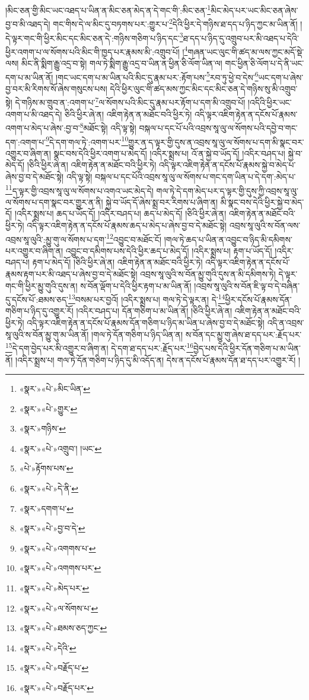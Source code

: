 །མིང་ཅན་གྱི་མིང་ཡང་འཐད་པ་ཡིན་ན་མིང་ཅན་མེད་ན་དེ་གང་གི་:མིང་ཅན་\footnote{«སྣར་»«པེ་»མིང་ཡིན་}མིང་མེད་པར་ཡང་མིང་ཅན་ཞེས་བྱ་བ་མི་འཐད་དེ། གང་གིས་དེ་ལ་མིང་དུ་བཏགས་པར་:གྱུར་པ་\footnote{«སྣར་»«པེ་»གྱུར་}དེའི་ཕྱིར་དེ་གཉིས་ཐ་དད་པ་ཉིད་ཀྱང་མ་ཡིན་ནོ། །དེ་ལྟར་གང་གི་ཕྱིར་མིང་དང་མིང་ཅན་དེ་:གཉིས་གཅིག་པ་ཉིད་དང་\footnote{«སྣར་»གཉིས་}ཐ་དད་པ་ཉིད་དུ་འགྲུབ་པར་མི་འཐད་པ་དེའི་ཕྱིར་འགག་པ་ལ་སོགས་པའི་མིང་གི་ཁྱད་པར་རྣམས་མི་:འགྲུབ་པོ། །\footnote{«སྣར་»«པེ་»འགྲུབ་། །ཡང་}གཞན་ཡང་ལུང་གི་ཚད་མ་ལས་ཀྱང་མདོ་སྡེ་ལས། མིང་ནི་སྨིག་རྒྱུ་འདྲ་བ་སྟེ། གལ་ཏེ་སྨིག་རྒྱུ་འདྲ་བ་ཡིན་ན་ཕྱིན་ཅི་ལོག་ཡིན་ལ། གང་ཕྱིན་ཅི་ལོག་པ་དེ་ནི་ཡང་དག་པ་མ་ཡིན་ནོ། །གང་ཡང་དག་པ་མ་ཡིན་པའི་མིང་དུ་རྣམ་པར་:རྟོག་པས་\footnote{«པེ་»རྟོགས་པས་}རབ་ཏུ་ཕྱེ་བ་དེས་\footnote{«སྣར་»«པེ་»དེ་ནི་}ཡང་དག་པ་ཞེས་བྱ་བར་མི་རིགས་སོ་ཞེས་གསུངས་པས། དེའི་ཕྱིར་ལུང་གི་ཚད་མས་ཀྱང་མིང་དང་མིང་ཅན་དེ་གཉིས་སུ་མི་འགྲུབ་སྟེ། དེ་གཉིས་མ་གྲུབ་ན་:འགག་པ་\footnote{«སྣར་»དགག་པ་}ལ་སོགས་པའི་མིང་དུ་རྣམ་པར་རྟོག་པ་དག་མི་འགྲུབ་པོ། །འདིའི་ཕྱིར་ཡང་འགག་པ་མི་འཐད་དེ། ཅིའི་ཕྱིར་ཞེ་ན། འཇིག་རྟེན་ན་མཐོང་བའི་ཕྱིར་ཏེ། འདི་ལྟར་འཇིག་རྟེན་ན་དངོས་པོ་རྣམས་འགག་པ་མེད་པ་ཞེས་:བྱ་བ་\footnote{«སྣར་»«པེ་»བྱ་བ་དེ་}མཐོང་སྟེ། འདི་ལྟ་སྟེ། བསྐལ་པ་དང་པོ་པའི་འབྲས་སཱ་ལུ་ལ་སོགས་པའི་དབྱེ་བ་གང་དག་:འགག་པ་\footnote{«སྣར་»«པེ་»འགགས་པ་}དེ་དག་གལ་ཏེ་:འགག་པར་\footnote{«སྣར་»«པེ་»འགགས་པར་}གྱུར་ན་ད་ལྟར་གྱི་དུས་ན་འབྲས་སཱ་ལུ་ལ་སོགས་པ་དག་མི་སྣང་བར་འགྱུར་བ་ཞིག་ན། སྣང་བས་དེའི་ཕྱིར་འགག་པ་མེད་དོ། །འདིར་སྨྲས་པ། འོ་ན་སྐྱེ་བ་ཡོད་དོ། །འདིར་བཤད་པ། སྐྱེ་བ་མེད་དོ། །ཅིའི་ཕྱིར་ཞེ་ན། འཇིག་རྟེན་ན་མཐོང་བའི་ཕྱིར་ཏེ། འདི་ལྟར་འཇིག་རྟེན་ན་དངོས་པོ་རྣམས་སྐྱེ་བ་མེད་པ་ཞེས་བྱ་བ་དེ་མཐོང་སྟེ། འདི་ལྟ་སྟེ། བསྐལ་པ་དང་པོའི་འབྲས་སཱ་ལུ་ལ་སོགས་པ་གང་དག་ཡིན་པ་དེ་དག་:མེད་པ་\footnote{«སྣར་»«པེ་»མེད་པར་}ད་ལྟར་གྱི་འབྲས་སཱ་ལུ་ལ་སོགས་པ་འགའ་ཡང་མེད་དེ། གལ་ཏེ་དེ་དག་མེད་པར་ད་ལྟར་གྱི་དུས་ཀྱི་འབྲས་སཱ་ལུ་ལ་སོགས་པ་དག་སྣང་བར་གྱུར་ན་ནི། སྐྱེ་བ་ཡོད་དོ་ཞེས་སྨྲ་བར་རིགས་པ་ཞིག་ན། མི་སྣང་བས་དེའི་ཕྱིར་སྐྱེ་བ་མེད་དོ། །འདིར་སྨྲས་པ། ཆད་པ་ཡོད་དོ། །འདིར་བཤད་པ། ཆད་པ་མེད་དོ། །ཅིའི་ཕྱིར་ཞེ་ན། འཇིག་རྟེན་ན་མཐོང་བའི་ཕྱིར་ཏེ། འདི་ལྟར་འཇིག་རྟེན་ན་དངོས་པོ་རྣམས་ཆད་པ་མེད་པ་ཞེས་བྱ་བ་དེ་མཐོང་སྟེ། འབྲས་སཱ་ལུའི་ས་བོན་ལས་འབྲས་སཱ་ལུའི་:མྱུ་གུ་ལ་སོགས་པ་དག་\footnote{«སྣར་»«པེ་»ལ་སོགས་པ་}འབྱུང་བ་མཐོང་ངོ། །གལ་ཏེ་ཆད་པ་ཡིན་ན་འབྱུང་བ་ཉིད་མི་དམིགས་པར་འགྱུར་བ་ཞིག་ན། འབྱུང་བ་དམིགས་པས་དེའི་ཕྱིར་ཆད་པ་མེད་དོ། །འདིར་སྨྲས་པ། རྟག་པ་ཡོད་དོ། །འདིར་བཤད་པ། རྟག་པ་མེད་དོ། །ཅིའི་ཕྱིར་ཞེ་ན། འཇིག་རྟེན་ན་མཐོང་བའི་ཕྱིར་ཏེ། འདི་ལྟར་འཇིག་རྟེན་ན་དངོས་པོ་རྣམས་རྟག་པར་མི་འཐད་པ་ཞེས་བྱ་བ་དེ་མཐོང་སྟེ། འབྲས་སཱ་ལུའི་ས་བོན་མྱུ་གུའི་དུས་ན་མི་དམིགས་ཏེ། དེ་ལྟར་གང་གི་ཕྱིར་མྱུ་གུའི་དུས་ན། ས་བོན་ལྡོག་པ་དེའི་ཕྱིར་རྟག་པ་མ་ཡིན་ནོ། །འབྲས་སཱ་ལུའི་ས་བོན་ཇི་ལྟ་བ་དེ་བཞིན་དུ་དངོས་པོ་:ཐམས་ཅད་\footnote{«སྣར་»«པེ་»ཐམས་ཅད་ཀྱང་}བསམ་པར་བྱའོ། །འདིར་སྨྲས་པ། གལ་ཏེ་དེ་ལྟར་ན། དེ་\footnote{«སྣར་»«པེ་»དེའི་}ཕྱིར་དངོས་པོ་རྣམས་དོན་གཅིག་པ་ཉིད་དུ་འགྱུར་རོ། །འདིར་བཤད་པ། དོན་གཅིག་པ་མ་ཡིན་ནོ། །ཅིའི་ཕྱིར་ཞེ་ན། འཇིག་རྟེན་ན་མཐོང་བའི་ཕྱིར་ཏེ། འདི་ལྟར་འཇིག་རྟེན་ན་དངོས་པོ་རྣམས་དོན་གཅིག་པ་ཉིད་མ་ཡིན་པ་ཞེས་བྱ་བ་དེ་མཐོང་སྟེ། འདི་ན་འབྲས་སཱ་ལུའི་ས་བོན་མྱུ་གུ་མ་ཡིན་ནོ། །གལ་ཏེ་དོན་གཅིག་པ་ཉིད་ཡིན་ན། ས་བོན་དང་མྱུ་གུ་ཞེས་ཐ་དད་པར་:རྗོད་པར་\footnote{«སྣར་»«པེ་»བརྗོད་པ་}དེ་དག་བྱེད་པར་མི་འགྱུར་བ་ཞིག་ན། དེ་དག་ཐ་དད་པར་:རྗོད་པར་\footnote{«སྣར་»«པེ་»བརྗོད་པར་}བྱེད་པས་དེའི་ཕྱིར་དོན་གཅིག་པ་མ་ཡིན་ནོ། །འདིར་སྨྲས་པ། གལ་ཏེ་དོན་གཅིག་པ་ཉིད་དུ་མི་འདོད་ན། དེས་ན་དངོས་པོ་རྣམས་དོན་ཐ་དད་པར་འགྱུར་རོ། །
